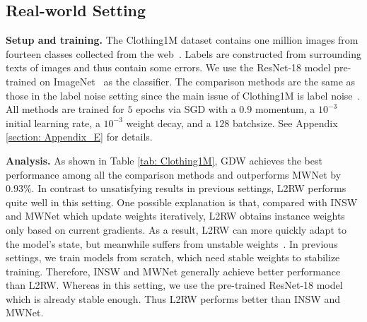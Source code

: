 \subsection{Real-world Setting}
\label{sec:real-world}


\noindent \textbf{Setup and training.} The Clothing1M dataset contains one million images from fourteen classes collected from the web~\cite{tongxiaoLearningMassiveNoisy2015}. 
%
Labels are constructed from surrounding texts of images and thus contain some errors.
%
We use the ResNet-18 model pre-trained on ImageNet~\cite{dengImageNetLargescaleHierarchical2009} as the classifier.
%
The comparison methods are the same as those in the label noise setting since the main issue of Clothing1M is label noise~\cite{tongxiaoLearningMassiveNoisy2015}.
%
All methods are trained for $5$ epochs via SGD with a $0.9$ momentum, a $10^{-3}$ initial learning rate, a $10^{-3}$ weight decay, and a $128$ batchsize.
%
See Appendix \ref{section: Appendix_E} for details.

\begin{table}
  \caption{Test accuracy on Clothing1M.}
  \label{tab: Clothing1M}
\end{table}


\noindent \textbf{Analysis.} As shown in Table \ref{tab: Clothing1M}, GDW achieves the best performance among all the comparison methods and outperforms MWNet by $0.93\%$.
%
In contrast to unsatisfying results in previous settings, L2RW performs quite well in this setting.
%
One possible explanation is that, compared with INSW and MWNet which update weights iteratively, L2RW obtains instance weights only based on current gradients.
%
As a result, L2RW can more quickly adapt to the model's state, but meanwhile suffers from unstable weights~\cite{shuMetaWeightNetLearningExplicit2019a}.
%
In previous settings, we train models from scratch, which need stable weights to stabilize training.
%
Therefore, INSW and MWNet generally achieve better performance than L2RW.
%
Whereas in this setting, we use the pre-trained ResNet-18 model which is already stable enough.
%
Thus L2RW performs better than INSW and MWNet.
